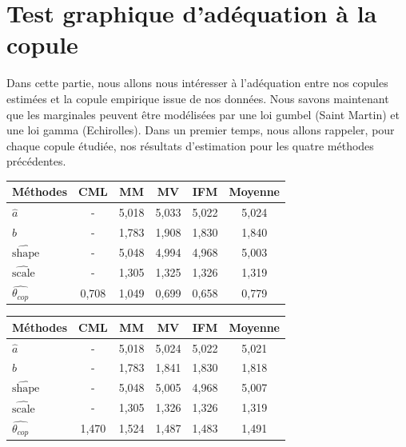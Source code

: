 \section{Test graphique d'adéquation à la copule}

Dans cette partie, nous allons nous intéresser à l'adéquation entre nos copules estimées et la copule empirique issue de nos données. Nous savons maintenant que les marginales peuvent être modélisées par une loi gumbel (Saint Martin) et une loi gamma (Echirolles). Dans un premier temps, nous allons rappeler, pour chaque copule étudiée, nos résultats d'estimation pour les quatre méthodes précédentes. 

\begin{center}
\begin{tabular}{| l | c | c | c | c | c |}
 \hline			
   Méthodes & CML & MM & MV & IFM & Moyenne \\
  \hline
   $\widehat{a}$ & - & 5,018 & 5,033 & 5,022 & 5,024 \\
    $\widehat{b}$ & - & 1,783 & 1,908 & 1,830 & 1,840 \\
    $\widehat{\text{shape}}$ & - & 5,048 & 4,994 & 4,968 & 5,003 \\
    $\widehat{\text{scale}}$ & - & 1,305 & 1,325 & 1,326 & 1,319 \\
    $\widehat{\theta_{cop}}$ & 0,708 & 1,049 & 0,699 & 0,658 & 0,779 \\
 \hline  
 \end{tabular}
\label{tab1}
\end{center}

\begin{center}
\begin{tabular}{| l | c | c | c | c | c |}
 \hline			
   Méthodes & CML & MM & MV & IFM & Moyenne \\
  \hline
   $\widehat{a}$ & - & 5,018 & 5,024 & 5,022 & 5,021 \\
    $\widehat{b}$ & - & 1,783 & 1,841 & 1,830 & 1,818 \\
    $\widehat{\text{shape}}$ & - & 5,048 & 5,005 & 4,968 & 5,007 \\
    $\widehat{\text{scale}}$ & - & 1,305 & 1,326 & 1,326 & 1,319 \\
    $\widehat{\theta_{cop}}$ & 1,470 & 1,524 & 1,487 & 1,483 & 1,491 \\
 \hline  
 \end{tabular}
\label{tab2}
\end{center}

